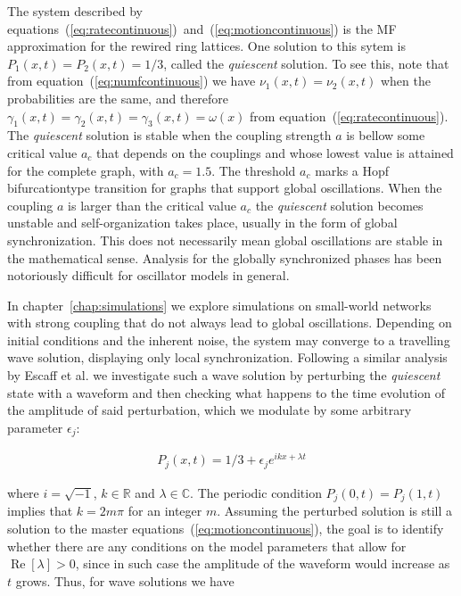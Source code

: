 The system described by equations~(\ref{eq:ratecontinuous})~and~(\ref{eq:motioncontinuous}) is the MF approximation for the rewired
ring lattices. One solution to this sytem is $P_1(x,t)=P_2(x,t)=1/3$, called the \textit{quiescent} solution. To see this, note that
from equation~(\ref{eq:numfcontinuous}) we have $\nu_1(x,t) = \nu_2(x,t)$ when the probabilities are the same, and therefore
$\gamma_1(x,t) = \gamma_2(x,t) = \gamma_3(x,t)=\omega(x)$ from equation~(\ref{eq:ratecontinuous}). The \textit{quiescent} solution is
stable when the coupling strength $a$ is bellow some critical value $a_c$ that depends on the couplings and whose lowest value is
attained for the complete graph, with $a_c=1.5$. The threshold $a_c$ marks a Hopf bifurcation\footnotemark type transition for graphs
that support global oscillations\cite{Wood06a}\cite{rodrigues2020synchronization}\cite{Wood06b}\cite{Wood07b}. When the coupling $a$ is
larger than the critical value $a_c$ the \textit{quiescent} solution becomes unstable and self-organization takes place, usually in the
form of global synchronization. This does not necessarily mean global oscillations are stable in the mathematical sense. Analysis for
the globally synchronized phases has been notoriously difficult for oscillator models in general.


In chapter~\ref{chap:simulations} we explore simulations on small-world networks with strong coupling that do not always lead to global
oscillations. Depending on initial conditions and the inherent noise, the system may converge to a travelling wave solution, displaying
only local synchronization. Following a similar analysis by Escaff et al.\cite{escaff2014arrays} we investigate such a wave solution by
perturbing the \textit{quiescent} state with a waveform and then checking what happens to the time evolution of the amplitude of said
perturbation, which we modulate by some arbitrary parameter $\epsilon_j$:

\begin{align}
    P_j(x,t) = 1/3 + \epsilon_j e^{ikx + \lambda t}
    \label{eq:solperturb}
\end{align}

\noindent where $i=\sqrt{-1}$, $k\in\mathbb{R}$ and $\lambda\in\mathbb{C}$. The periodic condition $P_j(0,t) = P_j(1,t)$ implies that
$k=2m\pi$ for an integer $m$. Assuming the perturbed solution is still a solution to the master equations~(\ref{eq:motioncontinuous}),
the goal is to identify whether there are any conditions on the model parameters that allow for $\operatorname{Re}[\lambda]>0$, since
in such case the amplitude of the waveform would increase as $t$ grows. Thus, for wave solutions we have


